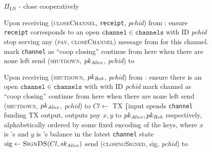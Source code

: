   \begin{figure}[H]
    \begin{protocolbox}{$\Pi_{\mathrm{LN}}$ - close cooperatively}
      \begin{algorithmic}[1]
        \State Upon receiving (\textsc{closeChannel}, \texttt{receipt},
        \textit{pchid}) from \environment:
        \Indent
          \State ensure \texttt{receipt} corresponds to an open
          $\mathtt{channel} \in \mathtt{channels}$ with ID \textit{pchid}
          \label{alg:protocol:close:coop:ensure}
          \State stop serving any (\textsc{pay}, \textsc{closeChannel}) message
          from \environment{} for this channel.
          \label{alg:protocol:close:coop:noserve}
          \State mark \texttt{channel} as ``coop closing''
            continue from here when there are none left
          \EndIf
          \label{alg:protocol:close:unilateral:init:continue}
          \State send (\textsc{shutdown}, $pk_{\mathit{Alice}}$, \textit{pchid}) to \bob
        \EndIndent
        \Statex

        \State Upon receiving (\textsc{shutdown}, $pk_{\mathit{Bob}}$, \textit{pchid})
        from \bob:
        \Indent
          \State ensure there is an open $\mathtt{channel} \in
          \mathtt{channels}$ with \bob with ID \textit{pchid}
            \State mark channel as ``coop closing''
              continue from here when there are none left
            \EndIf
            \label{alg:protocol:close:coop:shutdown:continue}
            \State send (\textsc{shutdown}, $pk_{\mathit{Alice}}$, \textit{pchid}) to
            \bob
          \Else
            \State $Cl \gets$ TX \{input spends \texttt{channel} funding TX
            output, outputs pay $x, y$ to $pk_{\mathit{Alice}}, pk_{\mathit{Bob}}$ respectively,
            alphabetically ordered by some fixed encoding of the keys, where $x$
            is \alice's and $y$ is \bob's balance in the latest \texttt{channel}
            state
            \State $\mathrm{sig} \gets \textsc{SignDS}(Cl, sk_{\mathit{Alice}})$
            \State send (\textsc{closingSigned}, sig, \textit{pchid}) to \bob
          \EndIf
        \EndIndent
        \Statex


\end{algorithmic}
\end{protocolbox}
\end{figure}
